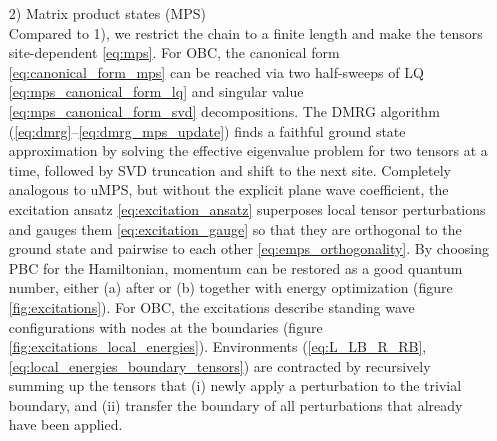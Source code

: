 \begin{enumerate}
	\item[2)] Matrix product states (MPS) \\[0.3em]
	Compared to 1), we restrict the chain to a finite length and make the tensors site-dependent \eqref{eq:mps}. For OBC, the canonical form \eqref{eq:canonical_form_mps} can be reached via two half-sweeps of LQ \eqref{eq:mps_canonical_form_lq} and singular value \eqref{eq:mps_canonical_form_svd} decompositions. The DMRG algorithm (\ref{eq:dmrg}--\ref{eq:dmrg_mps_update}) finds a faithful ground state approximation by solving the effective eigenvalue problem for two tensors at a time, followed by SVD truncation and shift to the next site. Completely analogous to uMPS, but without the explicit plane wave coefficient, the excitation ansatz \eqref{eq:excitation_ansatz} superposes local tensor perturbations and gauges them \eqref{eq:excitation_gauge} so that they are orthogonal to the ground state and pairwise to each other \eqref{eq:emps_orthogonality}. By choosing PBC for the Hamiltonian, momentum can be restored as a good quantum number, either (a) after or (b) together with energy optimization (figure \ref{fig:excitations}). For OBC, the excitations describe standing wave configurations with nodes at the boundaries (figure \ref{fig:excitations_local_energies}). Environments (\ref{eq:L_LB_R_RB}, \ref{eq:local_energies_boundary_tensors}) are contracted by recursively summing up the tensors that (i) newly apply a perturbation to the trivial boundary, and (ii) transfer the boundary of all perturbations that already have been applied.
	 

\end{enumerate}
